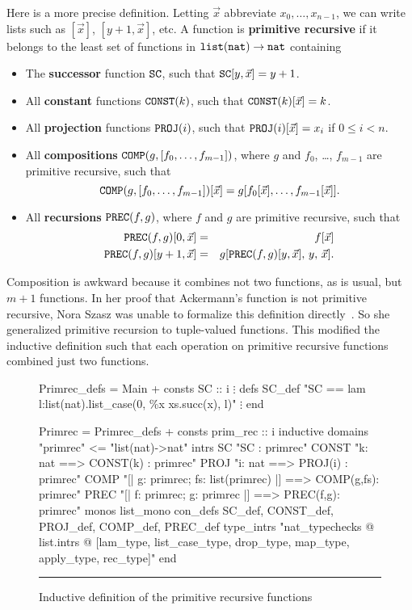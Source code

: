 \documentclass[12pt]{article}
\newcommand\defn[1]{{\bf#1}}
\newcommand\nat{\hbox{\tt nat}}
\newcommand\lst{\hbox{\tt list}}
\newcommand\SC{\hbox{\tt SC}}
\newcommand\CONST{\hbox{\tt CONST}}
\newcommand\PROJ{\hbox{\tt PROJ}}
\newcommand\COMP{\hbox{\tt COMP}}
\newcommand\PREC{\hbox{\tt PREC}}
\begin{document}
Here is a more precise definition.  Letting $\vec{x}$ abbreviate
$x_0,\ldots,x_{n-1}$, we can write lists such as $[\vec{x}]$,
$[y+1,\vec{x}]$, etc.  A function is \defn{primitive recursive} if it
belongs to the least set of functions in $\lst(\nat)\to\nat$ containing
\begin{itemize}
\item The \defn{successor} function $\SC$, such that $\SC[y,\vec{x}]=y+1$.
\item All \defn{constant} functions $\CONST(k)$, such that
  $\CONST(k)[\vec{x}]=k$. 
\item All \defn{projection} functions $\PROJ(i)$, such that
  $\PROJ(i)[\vec{x}]=x_i$ if $0\leq i<n$. 
\item All \defn{compositions} $\COMP(g,[f_0,\ldots,f_{m-1}])$, 
where $g$ and $f_0$, \ldots, $f_{m-1}$ are primitive recursive,
such that
\[ \COMP(g,[f_0,\ldots,f_{m-1}])[\vec{x}] = 
   g[f_0[\vec{x}],\ldots,f_{m-1}[\vec{x}]]. \] 

\item All \defn{recursions} $\PREC(f,g)$, where $f$ and $g$ are primitive
  recursive, such that
\begin{eqnarray*}
  \PREC(f,g)[0,\vec{x}] & = & f[\vec{x}] \\
  \PREC(f,g)[y+1,\vec{x}] & = & g[\PREC(f,g)[y,\vec{x}],\, y,\, \vec{x}].
\end{eqnarray*} 
\end{itemize}
Composition is awkward because it combines not two functions, as is usual,
but $m+1$ functions.  In her proof that Ackermann's function is not
primitive recursive, Nora Szasz was unable to formalize this definition
directly~\cite{szasz93}.  So she generalized primitive recursion to
tuple-valued functions.  This modified the inductive definition such that
each operation on primitive recursive functions combined just two functions.

\begin{figure}
\begin{ttbox}
Primrec_defs = Main +
consts SC :: i
 \(\vdots\)
defs
 SC_def    "SC == lam l:list(nat).list_case(0, \%x xs.succ(x), l)"
 \(\vdots\)
end

Primrec = Primrec_defs +
consts prim_rec :: i
inductive
 domains "primrec" <= "list(nat)->nat"
 intrs
   SC     "SC : primrec"
   CONST  "k: nat ==> CONST(k) : primrec"
   PROJ   "i: nat ==> PROJ(i) : primrec"
   COMP   "[| g: primrec; fs: list(primrec) |] ==> COMP(g,fs): primrec"
   PREC   "[| f: primrec; g: primrec |] ==> PREC(f,g): primrec"
 monos       list_mono
 con_defs    SC_def, CONST_def, PROJ_def, COMP_def, PREC_def
 type_intrs "nat_typechecks @ list.intrs @                      
             [lam_type, list_case_type, drop_type, map_type,    
              apply_type, rec_type]"
end
\end{ttbox}
\hrule
\caption{Inductive definition of the primitive recursive functions} 
\label{primrec-fig}
\end{figure}
\def\fs{{\it fs}} 
\end{document}
